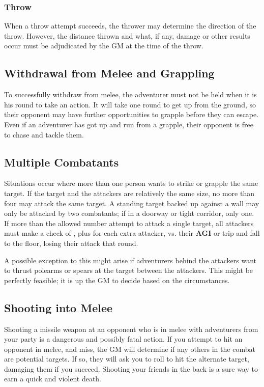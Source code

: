 \begin{multicols*}{2}
\subsubsection{Throw}
When a throw attempt succeeds, the thrower may determine the direction of the throw. However, the distance thrown and what, if any, damage or other results occur must be adjudicated by the GM at the time of the throw.
\subsection{Withdrawal from Melee and Grappling}
To successfully withdraw from melee, the adventurer must not be held when it is his round to take an action. It will take one round to get up from the ground, so their opponent may have further opportunities to grapple before they can escape. Even if an adventurer has got up and run from a grapple, their opponent is free to chase and tackle them.
\subsection{Multiple Combatants}
Situations occur where more than one person wants to strike or grapple the same target. If the target and the attackers are relatively the same size, no more than four may attack the same target. A standing target backed up against a wall may only be attacked by two combatants; if in a doorway or tight corridor, only one. If more than the allowed number attempt to attack a single target, all attackers must make a check of , plus  for each extra attacker, vs. their \textbf{AGI} or trip and fall to the floor, losing their attack that round.

A possible exception to this might arise if adventurers behind the attackers want to thrust polearms or spears at the target between the attackers. This might be perfectly feasible; it is up the GM to decide based on the circumstances.
\subsection{Shooting into Melee}
Shooting a missile weapon at an opponent who is in melee with adventurers from your party is a dangerous and possibly fatal action. If you attempt to hit an opponent in
melee, and miss, the GM will determine if any others in the combat are potential targets. If so, they will ask you to roll to hit the alternate target, damaging them if you succeed. Shooting your friends in the back is a sure way to earn a quick and violent death.

\end{multicols*}
